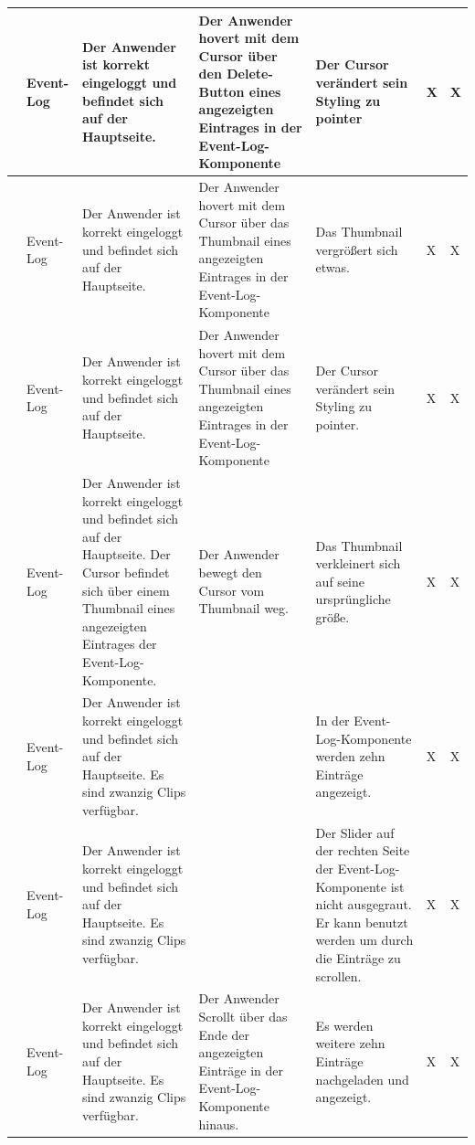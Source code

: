 \begin{longtable}{| p{} | p{} | p{} | p{} | p{} | p{} | p{} |}
	\stepcounter{TestNumber}\arabic{TestNumber} & Event-Log & Der Anwender ist korrekt eingeloggt und befindet sich auf der Hauptseite. & Der Anwender hovert mit dem Cursor über den Delete-Button eines angezeigten Eintrages in der Event-Log-Komponente & Der Cursor verändert sein Styling zu pointer & X & X \\ \hline
	
	\stepcounter{TestNumber}\arabic{TestNumber} & Event-Log & Der Anwender ist korrekt eingeloggt und befindet sich auf der Hauptseite. & Der Anwender hovert mit dem Cursor über das Thumbnail eines angezeigten Eintrages in der Event-Log-Komponente & Das Thumbnail vergrößert sich etwas. & X & X \\ \hline
	
	\stepcounter{TestNumber}\arabic{TestNumber} & Event-Log & Der Anwender ist korrekt eingeloggt und befindet sich auf der Hauptseite. & Der Anwender hovert mit dem Cursor über das Thumbnail eines angezeigten Eintrages in der Event-Log-Komponente & Der Cursor verändert sein Styling zu pointer. & X & X \\ \hline
	
	\stepcounter{TestNumber}\arabic{TestNumber} & Event-Log & Der Anwender ist korrekt eingeloggt und befindet sich auf der Hauptseite. Der Cursor befindet sich über einem Thumbnail eines angezeigten Eintrages der Event-Log-Komponente. & Der Anwender bewegt den Cursor vom Thumbnail weg. & Das Thumbnail verkleinert sich auf seine ursprüngliche größe. & X & X \\ \hline
	
	\stepcounter{TestNumber}\arabic{TestNumber} & Event-Log & Der Anwender ist korrekt eingeloggt und befindet sich auf der Hauptseite. Es sind zwanzig Clips verfügbar. & & In der Event-Log-Komponente werden zehn Einträge angezeigt. & X & X \\ \hline
	
	\stepcounter{TestNumber}\arabic{TestNumber} & Event-Log & Der Anwender ist korrekt eingeloggt und befindet sich auf der Hauptseite. Es sind zwanzig Clips verfügbar. & & Der Slider auf der rechten Seite der Event-Log-Komponente ist nicht ausgegraut. Er kann benutzt werden um durch die Einträge zu scrollen. & X & X \\ \hline
	
	\stepcounter{TestNumber}\arabic{TestNumber} & Event-Log & Der Anwender ist korrekt eingeloggt und befindet sich auf der Hauptseite. Es sind zwanzig Clips verfügbar. & Der Anwender Scrollt über das Ende der angezeigten Einträge in der Event-Log-Komponente hinaus. & Es werden weitere zehn Einträge nachgeladen und angezeigt. & X & X \\ \hline
	

\end{longtable}
